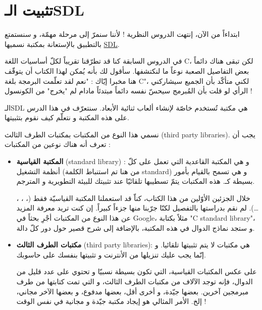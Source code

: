\chapter{تثبيت الـ\textenglish{SDL}}

ابتداءاً من الآن، إنتهت الدروس النظرية ! لأننا سنمرّ إلى مرحلة مهمّة، و سنستمتع بالتطبيق بالإستعانة بمكتبة نسميها
\underline{\textenglish{SDL}}.

في الدروس السابقة كنا قد تطرّقنا تقريباً لكلّ أساسيات اللغة
\textenglish{C}،
لكن تبقى هناك دائماً بعض التفاصيل الصعبة نوعاً ما لنكتشفها. سأقول لك بأنه يُمكن لهذا الكتاب أن يتوقّف هنا مخبرا إيّاك : "نعم لقد تعلّمت البرمجة بلغة 
\textenglish{C}"،
لكني متأكّد بأن الجميع سيشاركني الرأي لو قلت بأن المُبرمج سيحسّ نفسه دائماً مبتدئاً مادام لم "يخرج" من الكونسول !

الـ\textenglish{SDL}
هي مكتبة تُستخدم خاصّة لإنشاء ألعاب ثنائية الأبعاد. سنتعرّف في هذا الدرس على هذه المكتبة و نتعلّم كيف نقوم بتثبيتها.

نسمي هذا النوع من المكتبات بمكتبات الطرف الثالث 
(\textenglish{third party libraries}).
يجب أن تعرف أنه هناك نوعين من المكتبات :

\begin{itemize}
	\item \textbf{المكتبة القياسية}
	(\textenglish{standard library}) :
	و هي المكتبة القاعدية التي تعمل على كلّ أنظمة التشغيل (من هنا تم استنباط الكلمة 
	\textenglish{standard})
	و هي تسمح بالقيام بأمور بسيطة كـ.
	هذه المكتبات يتمّ تسطيبها تلقائيّا عند تثبيتك للبيئة التطويرية و المترجم.
	
	خلال الجزئين الأوّلين من هذا الكتاب، كناّ قد استعملنا المكتبة القياسيّة فقط
(، ، ،  \dots).
	لم نقم بدراستها بالتفصيل لكنّا جرّبنا منها جزءاً كبيراً. إن كنت تريد معرفة المزيد عن هذا النوع من المكتبات أجْرِ بحثاً في 
	\textenglish{Google}،
	مثلاً بكتابة
	"\textenglish{C standard library}"،
	و ستجد نماذج الدوال في هذه المكتبة، بالإضافة إلى شرح قصير حول دور كلّ دالة.
	\item \textbf{مكتبات الطرف الثالث}
	(\textenglish{third party libraries}):
	هي مكتبات لا يتم تثبيتها تلقائيا. و إنّما يجب عليك تنزيلها من الأنترنت و تثبيتها بنفسك على حاسوبك.

	على عكس المكتبات القياسية، التي تكون بسيطة نسبيّا و تحتوي على عدد قليل من الدوال، فإنه توجد الآلاف من مكتبات الطرف الثالث، و التي تمت كتابتها من طرف مبرمجين آخرين. بعضها جيّدة، و أخرى أقل، بعضها مدفوع، و بعضها الآخر مجاني، إلخ. الأمر المثالي هو إيجاد مكتبة جيّدة و مجانية في نفس الوقت !
\end{itemize}


